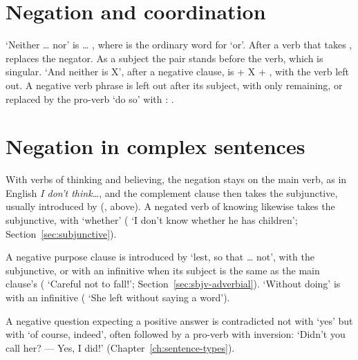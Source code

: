 \section{Negation and coordination}\label{sec:neg-coordination}
`Neither \ldots{} nor' is  \ldots{} , where  is the ordinary word for `or'. After a verb that takes ,  replaces the negator. As a subject the pair stands before the verb, which is singular.
`And neither is X', after a negative clause, is  + X + , with the verb left out.
A negative verb phrase is left out after its subject, with only  remaining, or replaced by the pro-verb  `do so' with : .

\section{Negation in complex sentences}\label{sec:neg-complex}
With verbs of thinking and believing, the negation stays on the main verb, as in English \textit{I don't think\ldots}, and the complement clause then takes the subjunctive, usually introduced by  (, above). A negated verb of knowing likewise takes the subjunctive, with  `whether' ( `I don't know whether he has children'; Section~\ref{sec:subjunctive}).

A negative purpose clause is introduced by  `lest, so that \ldots{} not', with the subjunctive, or with an infinitive when its subject is the same as the main clause's ( `Careful not to fall!'; Section~\ref{sec:sbjv-adverbial}). `Without doing' is  with an infinitive ( `She left without saying a word').

A negative question expecting a positive answer is contradicted not with  `yes' but with  `of course, indeed', often followed by a pro-verb with inversion:  `Didn't you call her? --- Yes, I did!' (Chapter~\ref{ch:sentence-types}).

